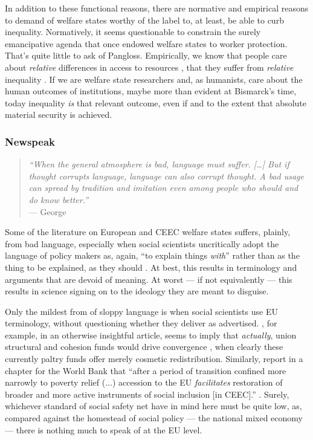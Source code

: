 \documentclass[11pt,a4paper,oneside,openright]{article}
\begin{document}
\begin{enumerate}
	In addition to these functional reasons, there are normative and empirical reasons to demand of welfare states worthy of the label to, at least, be able to curb inequality. 
	Normatively, it seems questionable to constrain the surely emancipative agenda that once endowed welfare states to worker protection. 
	That's quite little to ask of Pangloss. 
	Empirically, we know that people care about \emph{relative} differences in access to resources \citep{Frank2005}, that they suffer from \emph{relative} inequality \citep{Pickett-2009-kx}. 
	If we are welfare state researchers and, as humanists, care about the human outcomes of institutions, maybe more than evident at Bismarck's time, today inequality \emph{is} that relevant outcome, even if and to the extent that absolute material security is achieved.
\end{enumerate}

\subsubsection[Newspeak]{Newspeak} \label{sec:newspeak}

\begin{quote}
	\emph{``When the general atmosphere is bad, language must suffer. 
	[\ldots] But if thought corrupts language, language can also corrupt thought. 
	A bad usage can spread by tradition and imitation even among people who should and do know better.''}\\
	--- George \citealt{Orwell1946}
\end{quote}

Some of the literature on European and \gls{CEEC} welfare states suffers, plainly, from bad language, especially when social scientists uncritically adopt the language of policy makers as, again, ``to explain things \emph{with}'' rather than as the thing to be explained, as they should \citep{Brubaker-2002-aa}. 
At best, this results in terminology and arguments that are devoid of meaning. 
At worst --- if not equivalently --- this results in science signing on to the ideology they are meant to disguise.

Only the mildest from of sloppy language is when social scientists use \gls{EU} terminology, without questioning whether they deliver as advertised. 
\citeauthor{Dehey2003}, for example, in an otherwise insightful article, seems to imply that \emph{actually}, union structural and cohesion funds would drive convergence \citeyearpar[566]{Dehey2003}, when clearly these currently paltry funds offer merely cosmetic redistribution. 
Similarly, \citeauthor{Sipos2005} report in a chapter for the World Bank that ``after a period of transition confined more narrowly to poverty relief (...) accession to the \gls{EU} \emph{facilitates} restoration of broader and more active instruments of social inclusion [in \gls{CEEC}].'' \citeyearpar[89, emphasis added]{Sipos2005}. 
Surely, whichever standard \citeauthor{Sipos2005} of social safety net have in mind here must be quite low, as, compared against the homestead of social policy --- the national mixed economy --- there is nothing much to speak of at the \gls{EU} level.
\end{document}
